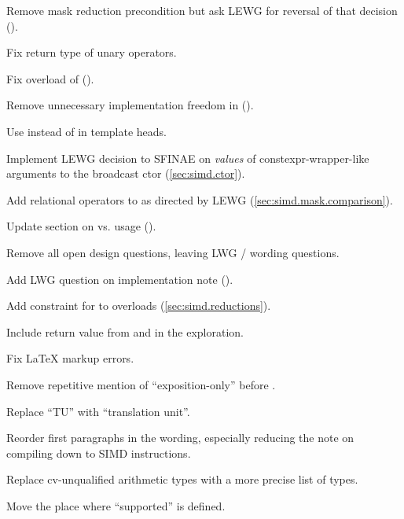 \begin{revision}
\item Remove mask reduction precondition but ask LEWG for reversal of that decision ().
\item Fix return type of \mask unary operators.
\item Fix  overload of \simdselect ().
\item Remove unnecessary implementation freedom in  ().
\item Use  instead of  in template heads.
\item Implement LEWG decision to SFINAE on \emph{values} of
  constexpr-wrapper-like arguments to the broadcast ctor (\ref{sec:simd.ctor}).
\item Add relational operators to \mask as directed by LEWG (\ref{sec:simd.mask.comparison}).
\item Update section on  vs.  usage ().
\item Remove all open design questions, leaving LWG / wording questions.
\item Add LWG question on implementation note ().
\item Add constraint for  to  overloads (\ref{sec:simd.reductions}).
\end{revision}

\begin{revision}
\item Include  return value from  and  in the exploration.
\item Fix \LaTeX{} markup errors.
\item Remove repetitive mention of “exposition-only” before \deducet.
\item Replace “TU” with “translation unit”.
\item Reorder first paragraphs in the wording, especially reducing the note on compiling down to SIMD instructions.
\item Replace cv-unqualified arithmetic types with a more precise list of types.
\item Move the place where “supported” is defined.
\end{revision}

